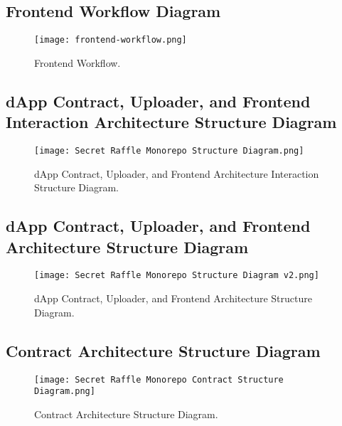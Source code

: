 \documentclass{article}
\begin{document}
\newpage

\subsection{Frontend Workflow Diagram}
\begin{figure}[h]
  \vspace{0cm}
  \hspace{0cm}
  \texttt{[image: frontend-workflow.png]}
  \caption{Frontend Workflow.}
  \label{fig:Frontend Workflow Appendix}
\end{figure}

\newpage

\subsection{dApp Contract, Uploader, and Frontend Interaction Architecture Structure Diagram}
\begin{figure}[h]
  \vspace{-0.5cm}
  \hspace{-3cm}
  \texttt{[image: Secret Raffle Monorepo Structure Diagram.png]}
  \caption{dApp Contract, Uploader, and Frontend Architecture Interaction Structure Diagram.}
  \label{fig:dApp Contract, Uploader, and Frontend Architecture Interaction Structure Diagram Appendix}
\end{figure}

\subsection{dApp Contract, Uploader, and Frontend Architecture Structure Diagram}
\begin{figure}[h]
  \vspace{0cm}
  \hspace{-3cm}
  \texttt{[image: Secret Raffle Monorepo Structure Diagram v2.png]}
  \caption{dApp Contract, Uploader, and Frontend Architecture Structure Diagram.}
  \label{fig:dApp Contract, Uploader, and Frontend Architecture Structure Diagram Appendix}
\end{figure}

\newpage

\subsection{Contract Architecture Structure Diagram}
\begin{figure}[h]
  \vspace{0cm}
  \hspace{-3cm}
  \texttt{[image: Secret Raffle Monorepo Contract Structure Diagram.png]}
  \caption{Contract Architecture Structure Diagram.}
  \label{fig:Contract Architecture Structure Diagram Appendix}
\end{figure}
\end{document}
